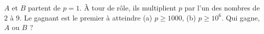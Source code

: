 $A$ et $B$ partent de $p = 1$. À tour de rôle, ils multiplient $p$ par l'un des nombres de $2$ à $9$. Le gagnant est le premier à atteindre (a) $p \geq 1000$, (b) $p \geq 10^6$. Qui gagne, $A$ ou $B$ ?
